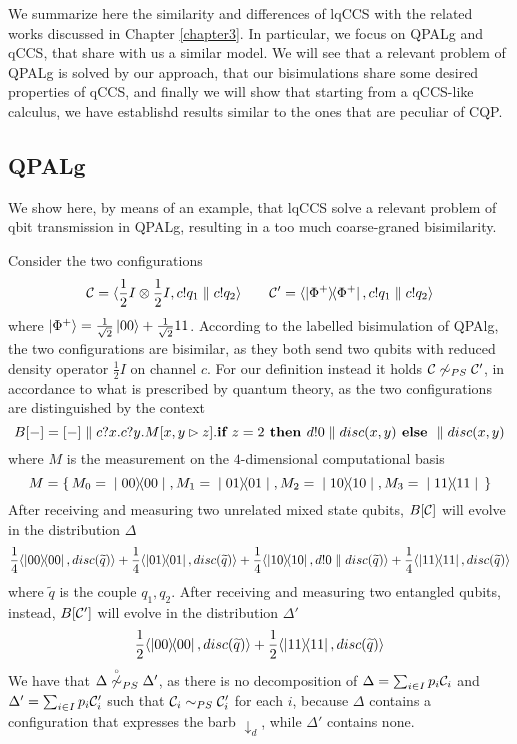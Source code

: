 We summarize here the similarity and differences of lqCCS with
the related works discussed in Chapter \ref{chapter3}.
In particular, we focus on QPALg and qCCS, that share with us a similar model.
We will see that a relevant problem of QPALg is solved by our approach, that
our bisimulations share some desired properties of qCCS, and finally we will show
that starting from a qCCS-like calculus, we have establishd results similar to the
ones that are peculiar of CQP.

\subsection{QPALg}
We show here, by means of an example, that lqCCS solve a relevant problem of qbit transmission in QPALg, resulting in a too much coarse-graned bisimilarity. 

Consider the two configurations
\[ \mathcal{C} = \langle\frac{1}{2}I \otimes \frac{1}{2}I, c!q_1 \parallel c!q_2\rangle \qquad \mathcal{C}' = \langle\ket{\Phi^+}\!\!\bra{\Phi^+}, c!q_1 \parallel c!q_2\rangle
\] where $\ket{\Phi^+} = \frac{1}{\sqrt{2}}\ket{00} + \frac{1}{\sqrt{2}}{11}$. According to the labelled bisimulation of QPAlg, the two configurations are bisimilar, as they both send two qubits with reduced density operator $\frac{1}{2}I$ on channel $c$. For our definition instead it holds $\mathcal{C} \not\sim_{PS} \mathcal{C}'$, in accordance to what is prescribed by quantum theory, as the two configurations are distinguished by the context \[B[{-}] = [{-}]\parallel c?x.c?y.M[x, y \rhd z].\textbf{if } z = 2 \textbf{ then } d!0 \parallel disc(x, y) \textbf{ else } \parallel disc(x, y)\] where $M$ is the measurement on the $4$-dimensional computational basis \[M = \set{M_0 = \proj{00}, M_1 = \proj{01}, M_2 = \proj{10}, M_3 = \proj{11}}\]
After receiving and measuring two unrelated mixed state qubits, $B[\mathcal{C}]$ will evolve in the distribution  $\Delta$
\[ \frac{1}{4}\confw{\proj{00}, disc(\widetilde{q})} + \frac{1}{4}\confw{\proj{01}, disc(\widetilde{q})} + \frac{1}{4}\confw{\proj{10}, d!0 \parallel disc(\widetilde{q})} + \frac{1}{4}\confw{\proj{11}, disc(\widetilde{q})} \] where $\widetilde{q}$ is the couple $q_1, q_2$.
After receiving and measuring two entangled qubits, instead, $B[\mathcal{C}']$ will evolve in the distribution $\Delta'$
\[ \frac{1}{2}\langle\ket{00}\!\!\bra{00}, disc(\widetilde{q})\rangle +  \frac{1}{2}\langle\ket{11}\!\!\bra{11}, disc(\widetilde{q})\rangle \] 
We have that $\Delta \stackrel{\scriptscriptstyle \circ}{\not\sim}_{PS} \Delta'$, as there is no decomposition of $\Delta = \sum_{i\in I} p_i \mathcal{C}_i$ and $\Delta' = \sum_{i\in I} p_i \mathcal{C}_i'$ such that $\mathcal{C}_i \sim_{PS} \mathcal{C}_i'$ for each $i$, because $\Delta$ contains a configuration that expresses the barb $\downarrow_d$, while $\Delta'$ contains none.

